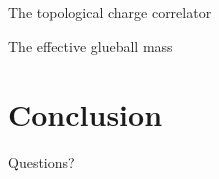 \documentclass[10pt,show notes on second screen]{beamer}
\begin{document}
\begin{frame}{The topological charge correlator}
\end{frame}

\begin{frame}{The effective glueball mass}
\end{frame}

\section{Conclusion}
\begin{frame}
\end{frame}

\begin{frame}
Questions?
\end{frame}




\end{document}
